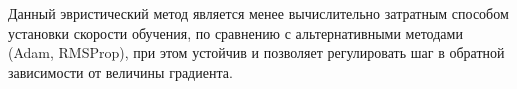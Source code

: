 Данный эвристический метод является менее вычислительно затратным способом установки скорости обучения, по сравнению с альтернативными методами (Adam, RMSProp), при этом устойчив и позволяет регулировать шаг в обратной зависимости от величины градиента.









\newpage
